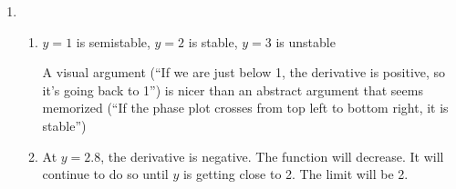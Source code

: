\begin{enumerate}
\item 
\begin{enumerate}
    \item 
    $y=1$ is semistable,
    $y=2$ is stable,
    $y=3$ is unstable
    
    A visual argument (``If we are just below 1, the derivative is positive, so it's going back to 1'') is nicer than an abstract argument that seems memorized (``If the phase plot crosses from top left to bottom right, it is stable'')

    \item 
    At $y=2.8$, the derivative is negative. The function will decrease. It will continue to do so until $y$ is getting close to 2. The limit will be 2.
\end{enumerate}

\end{enumerate}